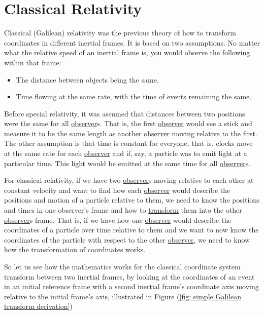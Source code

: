 \section{Classical Relativity} \label{sect: Classical Relativity}

Classical (Galilean) relativity was the previous theory of how to transform coordinates in different inertial frames.
It is based on two assumptions.
No matter what the relative speed of an inertial frame is, you would observe the following within that frame:

\begin{itemize}
	\item The distance between objects being the same.
	\item Time flowing at the same rate, with the time of events remaining the same.
\end{itemize}

Before special relativity, it was assumed that distances between two positions were the same for all \hyperlink{def-observer}{observer}s.
That is, the first \hyperlink{def-observer}{observer} would see a stick and measure it to be the same length as another \hyperlink{def-observer}{observer} moving relative to the first.
The other assumption is that time is constant for everyone, that is,
clocks move at the same rate for each \hyperlink{def-observer}{observer} and if, say, a particle was to emit light at a particular time.
This light would be emitted at the same time for all \hyperlink{def-observer}{observer}s.

For classical relativity, if we have two \hyperlink{def-observer}{observer}s moving relative to each other at constant velocity and want to find how each \hyperlink{def-observer}{observer} would describe the positions and motion of a particle relative to them, we need to know the positions and times in one observer's frame and how to \hyperlink{def-transform}{transform} them into the other \hyperlink{def-observer}{observer}s frame.
That is, if we have how one \hyperlink{def-observer}{observer} would describe the coordinates of a particle over time relative to them and we want to now know the coordinates of the particle with respect to the other \hyperlink{def-observer}{observer}, we need to know how the transformation of coordinates works.

So let us see how the mathematics works for the classical coordinate system transform between two inertial frames, by looking at the coordinates of an event in an initial reference frame with a second inertial frame's coordinate axis moving relative to the initial frame's axis, illustrated in Figure (\ref{fig: simple Galilean transform derivation})

